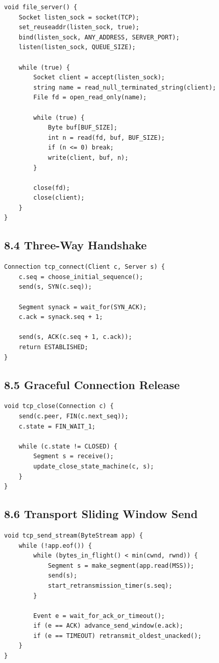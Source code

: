 \documentclass[11pt]{article}
\begin{document}
\begin{verbatim}
void file_server() {
    Socket listen_sock = socket(TCP);
    set_reuseaddr(listen_sock, true);
    bind(listen_sock, ANY_ADDRESS, SERVER_PORT);
    listen(listen_sock, QUEUE_SIZE);

    while (true) {
        Socket client = accept(listen_sock);
        string name = read_null_terminated_string(client);
        File fd = open_read_only(name);

        while (true) {
            Byte buf[BUF_SIZE];
            int n = read(fd, buf, BUF_SIZE);
            if (n <= 0) break;
            write(client, buf, n);
        }

        close(fd);
        close(client);
    }
}
\end{verbatim}

\subsection{8.4 Three-Way Handshake}\label{three-way-handshake}

\begin{verbatim}
Connection tcp_connect(Client c, Server s) {
    c.seq = choose_initial_sequence();
    send(s, SYN(c.seq));

    Segment synack = wait_for(SYN_ACK);
    c.ack = synack.seq + 1;

    send(s, ACK(c.seq + 1, c.ack));
    return ESTABLISHED;
}
\end{verbatim}

\subsection{8.5 Graceful Connection
Release}\label{graceful-connection-release}

\begin{verbatim}
void tcp_close(Connection c) {
    send(c.peer, FIN(c.next_seq));
    c.state = FIN_WAIT_1;

    while (c.state != CLOSED) {
        Segment s = receive();
        update_close_state_machine(c, s);
    }
}
\end{verbatim}

\subsection{8.6 Transport Sliding Window
Send}\label{transport-sliding-window-send}

\begin{verbatim}
void tcp_send_stream(ByteStream app) {
    while (!app.eof()) {
        while (bytes_in_flight() < min(cwnd, rwnd)) {
            Segment s = make_segment(app.read(MSS));
            send(s);
            start_retransmission_timer(s.seq);
        }

        Event e = wait_for_ack_or_timeout();
        if (e == ACK) advance_send_window(e.ack);
        if (e == TIMEOUT) retransmit_oldest_unacked();
    }
}
\end{verbatim}
\end{document}
